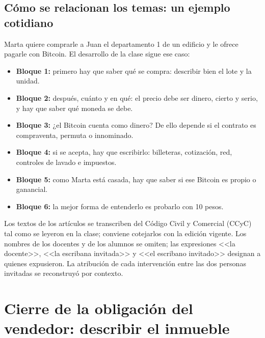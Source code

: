 \documentclass[12pt,oneside,a4paper]{book}
\begin{document}
\section{Cómo se relacionan los temas: un ejemplo cotidiano}

Marta quiere comprarle a Juan el departamento 1 de un edificio y le ofrece pagarle con Bitcoin. El desarrollo de la clase sigue ese caso:

\begin{itemize}
    \item \textbf{Bloque 1:} primero hay que saber qué se compra: describir bien el lote y la unidad.
    \item \textbf{Bloque 2:} después, cuánto y en qué: el precio debe ser dinero, cierto y serio, y hay que saber qué moneda se debe.
    \item \textbf{Bloque 3:} ¿el Bitcoin cuenta como dinero? De ello depende si el contrato es compraventa, permuta o innominado.
    \item \textbf{Bloque 4:} si se acepta, hay que escribirlo: billeteras, cotización, red, controles de lavado e impuestos.
    \item \textbf{Bloque 5:} como Marta está casada, hay que saber si ese Bitcoin es propio o ganancial.
    \item \textbf{Bloque 6:} la mejor forma de entenderlo es probarlo con 10 pesos.
\end{itemize}

\begin{note}
Los textos de los artículos se transcriben del Código Civil y Comercial (CCyC) tal como se leyeron en la clase; conviene cotejarlos con la edición vigente. Los nombres de los docentes y de los alumnos se omiten; las expresiones <<la docente>>, <<la escribana invitada>> y <<el escribano invitado>> designan a quienes expusieron. La atribución de cada intervención entre las dos personas invitadas se reconstruyó por contexto.
\end{note}

\chapter{Cierre de la obligación del vendedor: describir el inmueble}
\end{document}
